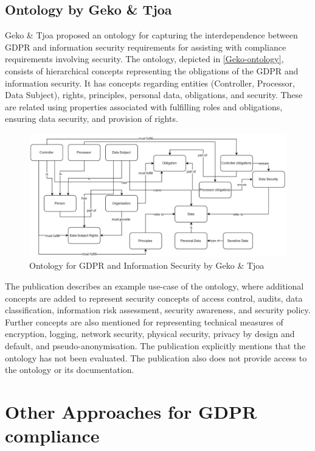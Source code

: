 \subsection{Ontology by Geko \& Tjoa}
Geko \& Tjoa \cite{geko_ontology_2018} proposed an ontology for capturing the interdependence between GDPR and information security requirements for assisting with compliance requirements involving security.
The ontology, depicted in \autoref{Geko-ontology}, consists of hierarchical concepts representing the obligations of the GDPR and information security.
It has concepts regarding entities (Controller, Processor, Data Subject), rights, principles, personal data, obligations, and security. These are related using properties associated with fulfilling roles and obligations, ensuring data security, and provision of rights.
\begin{figure}[htbp]
    \centering
    \includegraphics[width=\linewidth]{img/Geko_ontology.png}
    \caption{Ontology for GDPR and Information Security by Geko \& Tjoa \cite{geko_ontology_2018}}
    \label{fig:Geko-ontology}
\end{figure}

The publication describes an example use-case of the ontology, where additional concepts are added to represent security concepts of access control, audits, data classification, information risk assessment, security awareness, and security policy. Further concepts are also mentioned for representing technical measures of encryption, logging, network security, physical security, privacy by design and default, and pseudo-anonymisation.
The publication explicitly mentions that the ontology has not been evaluated. The publication also does not provide access to the ontology or its documentation.

\section{Other Approaches for GDPR compliance}\label{sec:sota:gdpr-other}

